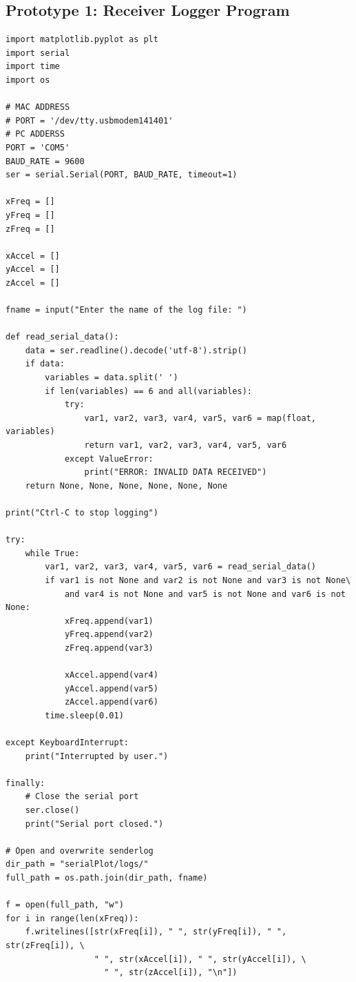 \subsection{Prototype 1: Receiver Logger Program}
\begin{verbatim}
import matplotlib.pyplot as plt
import serial
import time
import os

# MAC ADDRESS
# PORT = '/dev/tty.usbmodem141401'
# PC ADDERSS
PORT = 'COM5'
BAUD_RATE = 9600
ser = serial.Serial(PORT, BAUD_RATE, timeout=1)

xFreq = []
yFreq = []
zFreq = [] 

xAccel = []
yAccel = []
zAccel = []

fname = input("Enter the name of the log file: ")

def read_serial_data():
    data = ser.readline().decode('utf-8').strip()
    if data:
        variables = data.split(' ')
        if len(variables) == 6 and all(variables):
            try:
                var1, var2, var3, var4, var5, var6 = map(float, variables)
                return var1, var2, var3, var4, var5, var6
            except ValueError:
                print("ERROR: INVALID DATA RECEIVED")
    return None, None, None, None, None, None

print("Ctrl-C to stop logging")

try:
    while True:
        var1, var2, var3, var4, var5, var6 = read_serial_data()
        if var1 is not None and var2 is not None and var3 is not None\
            and var4 is not None and var5 is not None and var6 is not None:
            xFreq.append(var1) 
            yFreq.append(var2)
            zFreq.append(var3)

            xAccel.append(var4)
            yAccel.append(var5)
            zAccel.append(var6)
        time.sleep(0.01)

except KeyboardInterrupt:
    print("Interrupted by user.")

finally:
    # Close the serial port
    ser.close()
    print("Serial port closed.")

# Open and overwrite senderlog
dir_path = "serialPlot/logs/"
full_path = os.path.join(dir_path, fname)

f = open(full_path, "w")
for i in range(len(xFreq)):
    f.writelines([str(xFreq[i]), " ", str(yFreq[i]), " ", str(zFreq[i]), \
                  " ", str(xAccel[i]), " ", str(yAccel[i]), \
                    " ", str(zAccel[i]), "\n"]) 
\end{verbatim}
